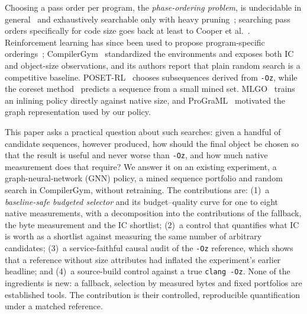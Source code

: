 \documentclass[conference,a4paper]{IEEEtran}
\begin{document}
Choosing a pass order per program, the \emph{phase-ordering problem},
is undecidable in general~\cite{touati2006} and exhaustively searchable
only with heavy pruning~\cite{kulkarni2006}; searching pass orders
specifically for code size goes back at least to Cooper et
al.~\cite{cooper1999}. Reinforcement learning has since been used to
propose program-specific
orderings~\cite{autophase,compilergym,posetrl,coreset,mammadli};
CompilerGym~\cite{compilergym} standardized the environments and
exposes both IC and object-size observations, and its authors report
that plain random search is a competitive baseline. POSET-RL~\cite{posetrl}
chooses subsequences derived from \texttt{-Oz}, while the coreset
method~\cite{coreset} predicts a sequence from a small mined set.
MLGO~\cite{mlgo} trains an inlining policy directly
against native size, and ProGraML~\cite{programl} motivated the graph
representation used by our policy.

This paper asks a practical question about such searches: given a
handful of candidate sequences, however produced, how should the final
object be chosen so that the result is useful and never worse than
\texttt{-Oz}, and how much native measurement does that require? We
answer it on an existing experiment, a graph-neural-network (GNN)
policy, a mined sequence portfolio and random search in CompilerGym,
without retraining. The contributions are: (1)~a \emph{baseline-safe
budgeted selector} and its budget--quality curve for one to eight native
measurements, with a decomposition into the contributions of the
fallback, the byte measurement and the IC shortlist; (2)~a control that
quantifies what IC is worth as a shortlist against measuring the same
number of arbitrary candidates; (3)~a service-faithful causal audit of
the \texttt{-Oz} reference, which shows that a reference without size
attributes had inflated the experiment's earlier headline; and (4)~a
source-build control against a true \texttt{clang -Oz}. None of the
ingredients is new: a fallback, selection by measured bytes and fixed
portfolios are established tools. The contribution is their controlled,
reproducible quantification under a matched reference.
\end{document}
